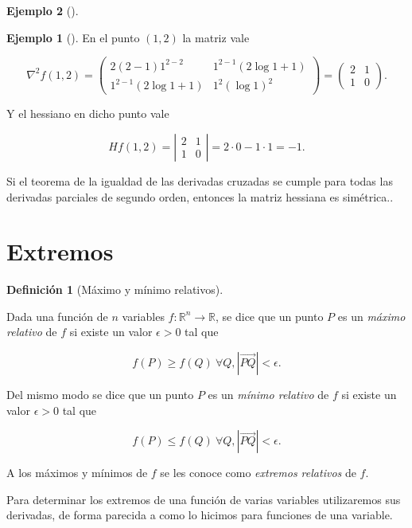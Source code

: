 \documentclass[
  a4paper,
]{scrreport}
\theoremstyle{definition}
\newtheorem{example}{Ejemplo}[chapter]
\theoremstyle{plain}
\theoremstyle{definition}
\newtheorem{definition}{Definición}[chapter]
\theoremstyle{definition}
\theoremstyle{plain}
\theoremstyle{plain}
\theoremstyle{remark}
\begin{document}
\begin{example}[]
\begin{example}[]
En el punto \((1,2)\) la matriz vale

\[\nabla^2f(1,2)=\left(
\begin{array}{cc}
2(2-1)1^{2-2} & 1^{2-1}(2\log 1+1) \\
1^{2-1}(2\log 1+1) & 1^2(\log 1)^2
\end{array}
\right)
=
\left(
\begin{array}{cc}
2 & 1 \\
1 & 0
\end{array}
\right).\]

Y el hessiano en dicho punto vale

\[Hf(1,2)=\left|
\begin{array}{cc}
2 & 1 \\
1 & 0
\end{array}
\right|=
2\cdot 0-1\cdot1= -1.
\]

\end{example}

Si el teorema de la igualdad de las derivadas cruzadas se cumple para
todas las derivadas parciales de segundo orden, entonces la matriz
hessiana es simétrica..

\section{Extremos}\label{extremos}

\begin{definition}[Máximo y mínimo
relativos]\protect\hypertarget{def-extremos-relativos}{}\label{def-extremos-relativos}

Dada una función de \(n\) variables \(f:\mathbb{R}^n\to \mathbb{R}\), se
dice que un punto \(P\) es un \emph{máximo relativo} de \(f\) si existe
un valor \(\epsilon>0\) tal que

\[
f(P)\geq f(Q)\ \forall Q, |\vec{PQ}|<\epsilon.
\]

Del mismo modo se dice que un punto \(P\) es un \emph{mínimo relativo}
de \(f\) si existe un valor \(\epsilon>0\) tal que

\[
f(P)\leq f(Q)\ \forall Q, |\vec{PQ}|<\epsilon.
\]

A los máximos y mínimos de \(f\) se les conoce como \emph{extremos
relativos} de \(f\).

\end{definition}

Para determinar los extremos de una función de varias variables
utilizaremos sus derivadas, de forma parecida a como lo hicimos para
funciones de una variable.


\end{example}
\end{document}
